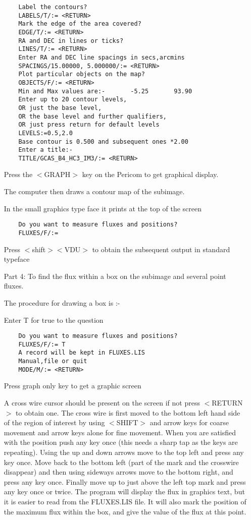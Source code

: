 \begin{itemize}
\begin{verbatim}
    Label the contours?
    LABELS/T/:= <RETURN>
    Mark the edge of the area covered?
    EDGE/T/:= <RETURN>
    RA and DEC in lines or ticks?
    LINES/T/:= <RETURN>
    Enter RA and DEC line spacings in secs,arcmins
    SPACINGS/15.00000, 5.000000/:= <RETURN>
    Plot particular objects on the map?
    OBJECTS/F/:= <RETURN>
    Min and Max values are:-       -5.25       93.90                             
    Enter up to 20 contour levels,                                               
    OR just the base level,
    OR the base level and further qualifiers,
    OR just press return for default levels
    LEVELS:=0.5,2.0
    Base contour is 0.500 and subsequent ones *2.00                               
    Enter a title:-
    TITLE/GCAS_B4_HC3_IM3/:= <RETURN>
\end{verbatim}

Press the $<$GRAPH$>$ key on the Pericom to get graphical display.

The computer then draws a contour map of the subimage.

In the small graphics type face it prints at the top of the screen
\begin{verbatim}
    Do you want to measure fluxes and positions?
    FLUXES/F/:=
\end{verbatim}
Press $<$shift$>$$<$VDU$>$ to obtain the subsequent output in standard typeface

\pagebreak
\item [Part 4:] To find the flux within a box on the subimage and several point
fluxes.


The procedure for drawing a box is :-

Enter T for true to the question

\begin{verbatim}
    Do you want to measure fluxes and positions?
    FLUXES/F/:= T
    A record will be kept in FLUXES.LIS
    Manual,file or quit
    MODE/M/:= <RETURN>
\end{verbatim}

Press graph only key to get a graphic screen

A cross wire cursor should be present on the screen if not press $<$RETURN$>$ to
obtain one. The cross wire is first moved to the bottom left hand side of the
region of interest by using $<$SHIFT$>$ and arrow keys for coarse movement and 
arrow keys alone for fine movement. When you are satisfied with the position 
push any key once (this needs a sharp tap as the keys are repeating). Using the
up and down arrows move to the top left and press any key once. Move back to
the bottom left (part of the mark and the crosswire disappear) and then using
sideways arrows move to the bottom right, and press any key once. Finally move
up to just above the left top mark and press any key once or twice. The program 
will display the flux in graphics text, but it is easier to read from the
FLUXES.LIS file. It will also mark the position of the maximum flux within the
box, and give the value of the flux at this point.


\end{itemize}
